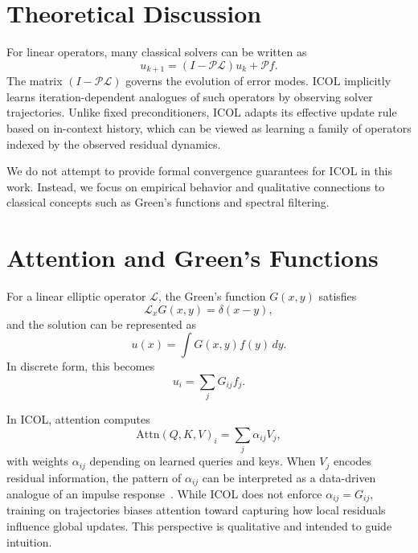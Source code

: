 \documentclass{article}
\begin{document}
\section{Theoretical Discussion}
\label{app:theory}

For linear operators, many classical solvers can be written as
\begin{equation}
u_{k+1} = (I - \mathcal{P}\mathcal{L})u_k + \mathcal{P}f.
\end{equation}
The matrix $(I - \mathcal{P}\mathcal{L})$ governs the evolution of error modes. ICOL implicitly learns iteration-dependent analogues of such operators by observing solver trajectories. Unlike fixed preconditioners, ICOL adapts its effective update rule based on in-context history, which can be viewed as learning a family of operators indexed by the observed residual dynamics.

We do not attempt to provide formal convergence guarantees for ICOL in this work. Instead, we focus on empirical behavior and qualitative connections to classical concepts such as Green’s functions and spectral filtering.

\section{Attention and Green's Functions}
\label{app:green}

For a linear elliptic operator $\mathcal{L}$, the Green’s function $G(x,y)$ satisfies
\begin{equation}
\mathcal{L}_x G(x,y) = \delta(x-y),
\end{equation}
and the solution can be represented as
\begin{equation}
u(x) = \int G(x,y) f(y)\,dy.
\end{equation}
In discrete form, this becomes
\begin{equation}
u_i = \sum_j G_{ij} f_j.
\end{equation}

In ICOL, attention computes
\begin{equation}
\mathrm{Attn}(Q,K,V)_i = \sum_j \alpha_{ij} V_j,
\end{equation}
with weights $\alpha_{ij}$ depending on learned queries and keys. When $V_j$ encodes residual information, the pattern of $\alpha_{ij}$ can be interpreted as a data-driven analogue of an impulse response~\cite{kutz2017deep}. While ICOL does not enforce $\alpha_{ij} = G_{ij}$, training on trajectories biases attention toward capturing how local residuals influence global updates. This perspective is qualitative and intended to guide intuition.
\end{document}
